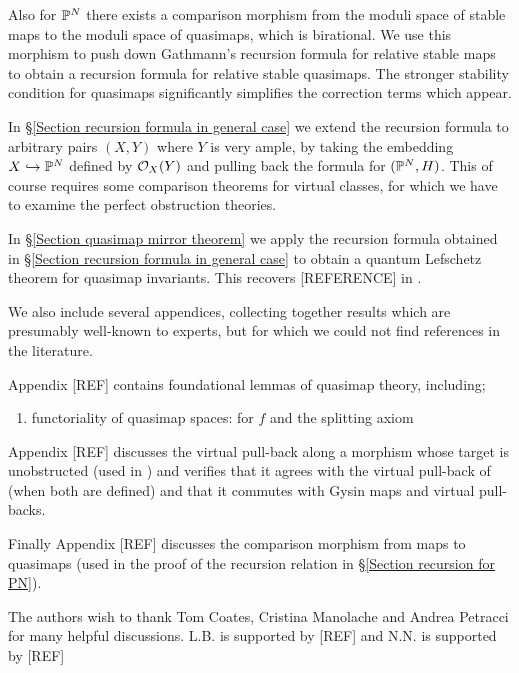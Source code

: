 Also for $\mathbb P^N$ there exists a comparison morphism from the moduli space of stable maps to the moduli space of quasimaps, which is birational. We use this morphism to push down Gathmann's recursion formula for relative stable maps to obtain a recursion formula for relative stable quasimaps. The stronger stability condition for quasimaps significantly simplifies the correction terms which appear.

In \S \ref{Section recursion formula in general case} we extend the recursion formula to arbitrary pairs $(X,Y)$ where $Y$ is very ample, by taking the embedding $X \hookrightarrow \mathbb P^N$ defined by $\mathcal{O}_X(Y)$ and pulling back the formula for $(\mathbb P^N,H)$. This of course requires some comparison theorems for virtual classes, for which we have to examine the perfect obstruction theories.

In \S \ref{Section quasimap mirror theorem} we apply the recursion formula obtained in \S \ref{Section recursion formula in general case} to obtain a quantum Lefschetz theorem for quasimap invariants. This recovers [REFERENCE] in \cite{CF-K-wallcrossing}.

We also include several appendices, collecting together results which are presumably well-known to experts, but for which we could not find references in the literature.

Appendix [REF] contains foundational lemmas of quasimap theory, including; 
\begin{enumerate}
\item functoriality of quasimap spaces: for $f$  and the splitting axiom
\end{enumerate}

Appendix [REF] discusses the virtual pull-back along a morphism whose target is unobstructed (used in \cite{Ga}) and verifies that it agrees with the virtual pull-back of \cite{Manolache-Pull} (when both are defined) and that it commutes with Gysin maps and virtual pull-backs.

Finally Appendix [REF] discusses the comparison morphism from maps to quasimaps (used in the proof of the recursion relation in \S \ref{Section recursion for PN}).

\begin{acknowledgements} The authors wish to thank Tom Coates, Cristina Manolache and Andrea Petracci for many helpful discussions. L.B. is supported by [REF] and N.N. is supported by [REF]
\end{acknowledgements}

